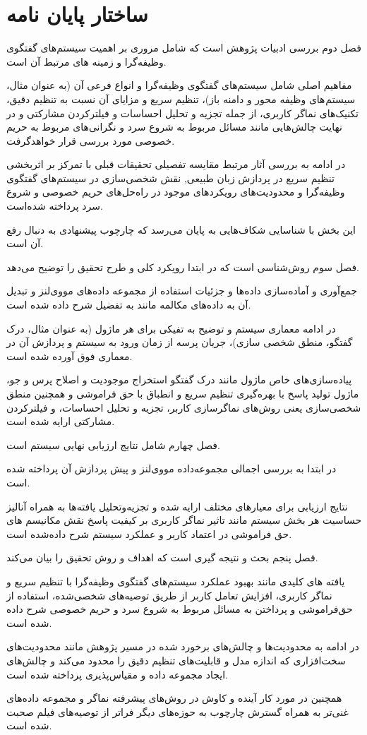 \section{ساختار پایان نامه}

فصل دوم بررسی ادبیات پژوهش است که شامل مروری بر اهمیت  سیستم‌های گفتگوی وظیفه‌گرا و زمینه های مرتبط آن است.

مفاهیم اصلی شامل سیستم‌های گفتگوی وظیفه‌گرا و انواع فرعی آن (به عنوان مثال، سیستم های وظیفه محور و دامنه باز)، تنظیم سریع و مزایای آن نسبت به تنظیم دقیق، تکنیک‌های نماگر کاربری، از جمله تجزیه و تحلیل احساسات و فیلتر‌کردن مشارکتی و در نهایت چالش‌هایی مانند مسائل مربوط به شروع سرد و نگرانی‌های مربوط به حریم خصوصی مورد بررسی قرار خواهد‌گرفت.

در ادامه به بررسی آثار مرتبط مقایسه تفصیلی تحقیقات قبلی با تمرکز بر اثربخشی تنظیم سریع در پردازش زبان طبیعی, نقش شخصی‌سازی در  سیستم‌های گفتگوی وظیفه‌گرا و محدودیت‌های رویکردهای موجود در راه‌حل‌های حریم خصوصی و شروع سرد پرداخته شده‌است.

این بخش با شناسایی شکاف‌هایی به پایان می‌رسد که چارچوب پیشنهادی به دنبال رفع آن است.

فصل سوم روش‌شناسی است که در ابتدا رویکرد کلی و طرح تحقیق را توضیح می‌دهد.

جمع‌آوری و آماده‌سازی داده‌ها و جزئیات استفاده از مجموعه داده‌های مووی‌لنز  و تبدیل آن به داده‌های مکالمه مانند به تفضیل شرح داده شده است.

در ادامه معماری سیستم و توضیح به تفیکی برای هر ماژول (به عنوان مثال، درک گفتگو، منطق شخصی سازی)، جریان پرسه از زمان ورود به سیستم و  پردازش آن در معماری فوق آورده شده است.

پیاده‌سازی‌های خاص ماژول مانند درک گفتگو استخراج موجودیت و اصلاح پرس و جو، ماژول تولید پاسخ با بهره‌گیری تنظیم سریع و انطباق با حق فراموشی و همچنین منطق شخصی‌سازی یعنی روش‌های نماگر‌سازی کاربر، تجزیه و تحلیل احساسات، و فیلتر‌کردن مشارکتی ارایه شده است.


فصل چهارم شامل نتایج ارزیابی نهایی سیستم است.

در ابتدا به بررسی اجمالی مجموعه‌داده مووی‌لنز و پیش پردازش آن پرداخته شده است.

نتایج ارزیابی برای معیارهای مختلف ارایه شده و  تجزیه‌و‌تحلیل یافته‌ها به همراه آنالیز حساسیت هر بخش سیستم مانند تاثیر نماگر کاربری بر کیفیت پاسخ  نقش مکانیسم های حق فراموشی در اعتماد کاربر و عملکرد سیستم شرح داده‌شده است.


فصل پنجم بحث و نتیجه گیری است که اهداف و روش تحقیق را بیان می‌کند.

یافته های کلیدی مانند بهبود عملکرد  سیستم‌های گفتگوی وظیفه‌گرا با تنظیم سریع و نماگر کاربری، افزایش تعامل کاربر از طریق توصیه‌های شخصی‌شده، استفاده از حق‌فراموشی و پرداختن به مسائل مربوط به شروع سرد و حریم خصوصی شرح داده شده است.

در ادامه به محدودیت‌ها و چالش‌های برخورد شده در مسیر پژوهش مانند محدودیت‌های سخت‌افزاری که اندازه مدل و قابلیت‌های تنظیم دقیق را محدود می‌کند و چالش‌های ایجاد مجموعه داده و مقیاس‌پذیری پرداخته شده است.

همچنین در مورد کار آینده و کاوش در روش‌های پیشرفته نماگر و مجموعه داده‌های غنی‌تر به همراه گسترش چارچوب به حوزه‌های دیگر فراتر از توصیه‌های فیلم صحبت شده است.
